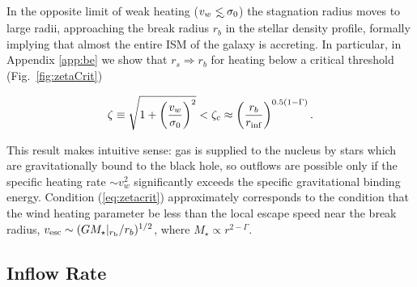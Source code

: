 \documentclass[usenatbib,fleqn]{mn2e}
\newcommand\lsim{\mathrel{\rlap{\lower4pt\hbox{\hskip1pt$\sim$}}
    \raise1pt\hbox{$<$}}}
\newcommand{\rs}{r_s}
\newcommand{\rb}{r_b}
\newcommand{\rinf}{r_{\rm inf}}
\begin{document}
In the opposite limit of weak heating ($v_w\lsim \sigma_0$) the
stagnation radius moves to large radii, approaching the break radius
$\rb$ in the stellar density profile, formally implying that almost the
entire ISM of the galaxy is accreting.  In particular, in Appendix
\ref{app:be} we show that $\rs \Rightarrow \rb$ for heating below a
critical threshold (Fig.~\ref{fig:zetaCrit}) 

\begin{equation} 
\zeta\equiv \sqrt{1 + \left(\frac{v_w}{\sigma_0}\right)^2} <
\zeta_c \approx \left(\frac{\rb}{\rinf}\right)^{0.5(1-\Gamma)}.
\label{eq:zetacrit}
\end{equation}

This result makes intuitive sense: gas is supplied to the nucleus
by stars which are gravitationally bound to the black hole, so
outflows are possible only if the specific heating rate $\sim
v_{w}^{2}$ significantly exceeds the specific gravitational binding
energy.  Condition (\ref{eq:zetacrit}) approximately corresponds to
the condition that the wind heating parameter be less than the local escape
speed near the break radius, $v_{\rm esc} \sim (GM_{\star}|_{r_{\rm
    b}}/r_b)^{1/2}$, where $M_{\star} \propto r^{2-\Gamma}$.

\subsection{Inflow Rate}
\end{document}
